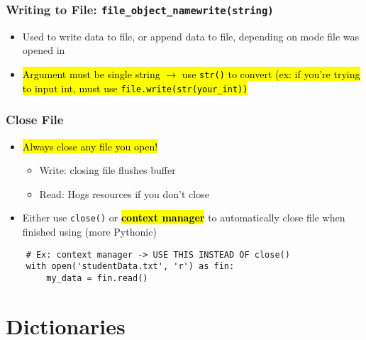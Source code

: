 \documentclass{article}
\begin{document}
\subsubsection{Writing to File: \texttt{file\_object\_namewrite(string)}}
    \begin{itemize}
        \item Used to write data to file, or append data to file, depending on mode file was opened in
        \item \hl{Argument must be single string $\rightarrow$ use \texttt{str()} to convert (ex: if you're trying to input int, must use \texttt{file.write(str(your\_int))}}
    \end{itemize}

\subsubsection{Close File}
    \begin{multicols}{2}
        \begin{itemize}
            \item \hl{Always close any file you open!}
                \begin{itemize}
                    \item Write: closing file flushes buffer
                    \item Read: Hogs resources if you don't close
                \end{itemize}
            \item Either use \texttt{close()} or \hl{\textbf{context manager}} to automatically close file when finished using (more Pythonic)
        \end{itemize}
    \end{multicols}
\vspace{-1em}
\begin{lstlisting}
    # Ex: context manager -> USE THIS INSTEAD OF close()
    with open('studentData.txt', 'r') as fin:
        my_data = fin.read()
\end{lstlisting}


\section{Dictionaries}
\end{document}
